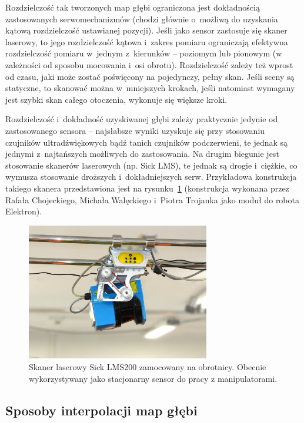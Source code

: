 Rozdzielczość tak tworzonych map głębi ograniczona jest dokładnością
zastosowanych serwomechanizmów (chodzi głównie o~możliwą do uzyskania
kątową rozdzielczość ustawianej pozycji). Jeśli jako sensor zastosuje się
skaner laserowy, to jego rozdzielczość kątowa i~zakres pomiaru ograniczają
efektywna rozdzielczość pomiaru w~jednym z~kierunków -- poziomym lub pionowym
(w zależności od sposobu mocowania i~osi obrotu). Rozdzielczość zależy też
wprost od czasu, jaki może zostać poświęcony na pojedynczy, pełny skan. Jeśli
sceny są statyczne, to skanować można w~mniejszych krokach, jeśli natomiast
wymagany jest szybki skan całego otoczenia, wykonuje się większe kroki.

Rozdzielczość i~dokładność uzyskiwanej głębi zależy praktycznie jedynie od
zastosowanego sensora -- najsłabsze wyniki uzyskuje się przy stosowaniu
czujników ultradźwiękowych bądź tanich czujników podczerwieni, te jednak są
jednymi z~najtańszych możliwych do zastosowania. Na drugim biegunie jest
stosowanie skanerów laserowych (np. Sick LMS), te jednak są drogie i~ciężkie, co
wymusza stosowanie droższych i~dokładniejszych serw. Przykładowa konstrukcja
takiego skanera przedstawiona jest na rysunku~\ref{fig:sick_obrotnica}
(konstrukcja wykonana przez Rafała Chojeckiego, Michała Walęckiego i~Piotra
Trojanka jako moduł do robota Elektron).

\begin{figure}[h!]
\centering
\includegraphics[height=6cm]{../../Common/img/sick_obrotnica}
\caption{Skaner laserowy Sick LMS200 zamocowany na obrotnicy. Obecnie wykorzystywany
jako stacjonarny sensor do pracy z manipulatorami.}
\label{fig:sick_obrotnica}
\end{figure}

\subsection{Sposoby interpolacji map głębi}

